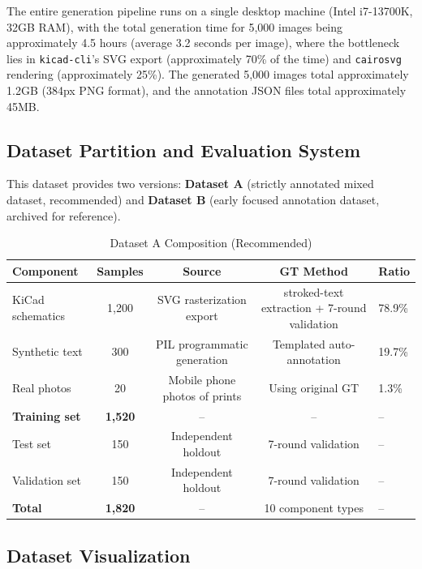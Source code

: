 The entire generation pipeline runs on a single desktop machine (Intel i7-13700K, 32GB RAM), with the total generation time for 5,000 images being approximately 4.5 hours (average 3.2 seconds per image), where the bottleneck lies in \texttt{kicad-cli}'s SVG export (approximately 70\% of the time) and \texttt{cairosvg} rendering (approximately 25\%). The generated 5,000 images total approximately 1.2GB (384px PNG format), and the annotation JSON files total approximately 45MB.

\subsection{Dataset Partition and Evaluation System}

This dataset provides two versions: \textbf{Dataset A} (strictly annotated mixed dataset, recommended) and \textbf{Dataset B} (early focused annotation dataset, archived for reference).

\begin{table}[h]
\centering
\caption{Dataset A Composition (Recommended)}
\label{tab:dataset}
\begin{tabular}{lcccl}
\toprule
\textbf{Component} & \textbf{Samples} & \textbf{Source} & \textbf{GT Method} & \textbf{Ratio} \\
\midrule
KiCad schematics   & 1,200 & SVG rasterization export & stroked-text extraction + 7-round validation & 78.9\% \\
Synthetic text     & 300   & PIL programmatic generation & Templated auto-annotation & 19.7\% \\
Real photos        & 20    & Mobile phone photos of prints & Using original GT & 1.3\% \\
\midrule
\textbf{Training set} & \textbf{1,520} & -- & -- & -- \\
Test set           & 150   & Independent holdout & 7-round validation & -- \\
Validation set     & 150   & Independent holdout & 7-round validation & -- \\
\midrule
\textbf{Total}     & \textbf{1,820} & -- & 10 component types & -- \\
\bottomrule
\end{tabular}
\end{table}

\subsection{Dataset Visualization}

